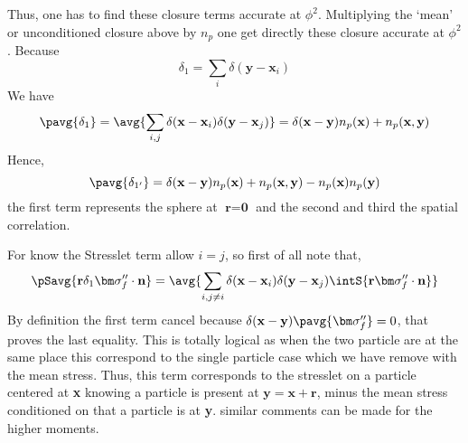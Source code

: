 Thus, one has to find these closure terms accurate at $\phi^2$.
Multiplying the `mean' or unconditioned closure above by $n_p$ one get directly these closure accurate at $\phi^2$. 
Because 
\begin{equation}
    \delta_1
    =
    \sum_i \delta(\textbf{y} - \textbf{x}_i)
\end{equation}
We have 
\begin{align}
    \pavg{\delta_1}
    =
    \avg{\sum_{i,j} \delta(\textbf{x}-\textbf{x}_i)\delta(\textbf{y}-\textbf{x}_j)}
    =
    \delta(\textbf{x}-\textbf{y})n_p(\textbf{x})
    +n_p(\textbf{x},\textbf{y})\\
\end{align}
Hence, 
\begin{equation}
    \pavg{\delta_{1'}}
    =
    \delta(\textbf{x} - \textbf{y}) n_p(\textbf{x})
    + n_p(\textbf{x},\textbf{y})
    - n_p(\textbf{x}) n_p(\textbf{y}) 
\end{equation}
the first term represents the sphere at $\textbf{r} = \textbf{0}$ and the second and third the spatial correlation. 

For know the Stresslet term allow $i=j$, so first of all note that,
\begin{align}
    \pSavg{\textbf{r}\delta_1\bm\sigma_f'' \cdot \textbf{n}}
    &=
     \avg{\sum_{i,j\neq i}\delta(\textbf{x}-\textbf{x}_i)\delta(\textbf{y}-\textbf{x}_j)\intS{\textbf{r}\bm\sigma_f'' \cdot \textbf{n}}}\\
\end{align}
By definition the first term cancel because $\delta(\textbf{x}-\textbf{y})\pavg{\bm\sigma_f''} = 0$, that proves the last equality. 
This is totally logical as when the two particle are at the same place this correspond to the single particle case which we have remove with the mean stress. 
Thus, this term corresponds to the stresslet on a particle centered at \textbf{x} knowing a particle is present at $\textbf{y}=\textbf{x}+\textbf{r}$, minus the mean stress conditioned on that a particle is at \textbf{y}. 
similar comments can be made for the higher moments. 


